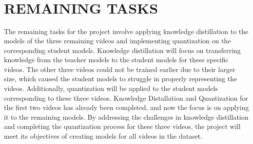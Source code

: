 \documentclass[]{ioereport}
\begin{document}


\coverpage


\coverpageB






\tableofcontents\
\pagebreak

\listoffigures\
\pagebreak

\listoftables\
\pagebreak

\doublespacing\
\printglossary[type=\acronymtype,style=acronyms-only,title=List of Abbreviations{\vspace{0.15\baselineskip}}]
\onehalfspacing\


\mainsection











\section{\MakeUppercase{Remaining Tasks}}
The remaining tasks for the project involve applying knowledge distillation to the models of the three remaining videos and implementing quantization on the corresponding student models. Knowledge distillation will focus on transferring knowledge from the teacher models to the student models for these specific videos. The other three videos could not be trained earlier due to their larger size, which caused the student models to struggle in properly representing the videos.
Additionally, quantization will be applied to the student models corresponding to these three videos. Knowledge Distallation and Quantization for the first two videos has already been completed, and now the focus is on applying it to the remaining models. By addressing the challenges in knowledge distillation and completing the quantization process for these three videos, the project will meet its objectives of creating models for all videos in the dataset.
\pagebreak


\end{document}
